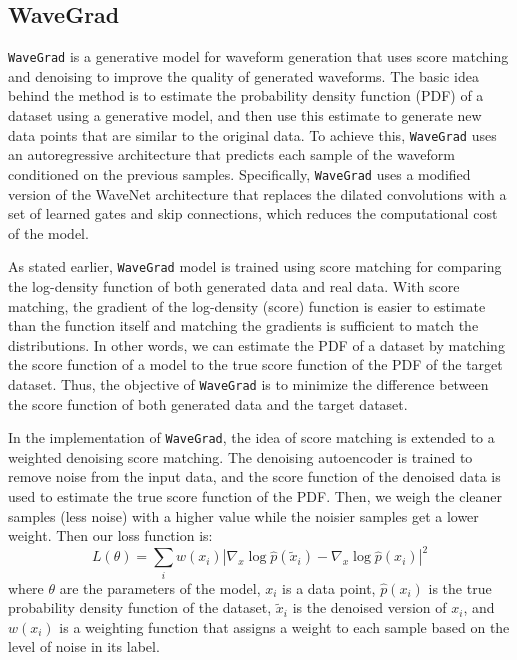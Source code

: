 \subsection{WaveGrad}
\texttt{WaveGrad} \cite{chen2020wavegrad} is a generative model for waveform generation that uses score matching \cite{song2020sliced,song2020improved} and denoising \cite{sohl2015deep,ho2020denoising} to improve the quality of generated waveforms. 
The basic idea behind the method is to estimate the probability density function (PDF) of a dataset using a generative model, and then use this estimate to generate new data points that are similar to the original data. To achieve this, \texttt{WaveGrad} uses an autoregressive architecture that predicts each sample of the waveform conditioned on the previous samples.
Specifically, \texttt{WaveGrad} uses a modified version of the WaveNet architecture that replaces the dilated convolutions with a set of learned gates and skip connections, which reduces the computational cost of the model.

As stated earlier, \texttt{WaveGrad} model is trained using score matching for comparing the log-density function of both generated data and real data.
With score matching, the gradient of the log-density (score) function is easier to estimate than the function itself and matching the gradients is sufficient to match the distributions.
In other words, we can estimate the PDF of a dataset by matching the score function of a model to the true score function of the PDF of the target dataset.
Thus, the objective of \texttt{WaveGrad} is to minimize the difference between the score function of both generated data and the target dataset.

In the implementation of \texttt{WaveGrad}, the idea of score matching is extended to a weighted denoising score matching.
The denoising autoencoder is trained to remove noise from the input data, and the score function of the denoised data is used to estimate the true score function of the PDF.
Then, we weigh the cleaner samples (less noise) with a higher value while the noisier samples get a lower weight. Then our loss function is:
\begin{equation}
    L(\theta) = \sum_i w(x_i) |\nabla_x \log \hat{p}(\tilde{x}_i) - \nabla_x \log \hat{p}(x_i)|^2
\end{equation} where $\theta$ are the parameters of the model, $x_i$ is a data point, $\hat{p}(x_i)$ is the true probability density function of the dataset, $\tilde{x}_i$ is the denoised version of $x_i$, and $w(x_i)$ is a weighting function that assigns a weight to each sample based on the level of noise in its label.

